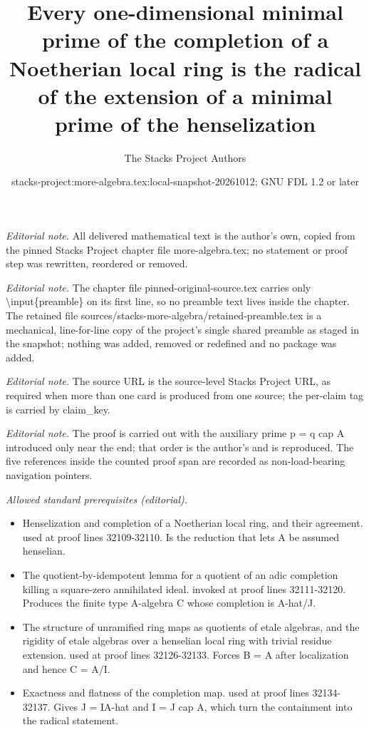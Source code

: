 \documentclass[10pt,a4paper]{amsart}
\title{Every one-dimensional minimal prime of the completion of a Noetherian local ring is the radical of the extension of a minimal prime of the henselization}
\author{The Stacks Project Authors}
\date{stacks-project:more-algebra.tex:local-snapshot-20261012; GNU FDL 1.2 or later}
\theoremstyle{plain}
\theoremstyle{definition}
\theoremstyle{remark}
\numberwithin{equation}{subsection}
\begin{document}
\maketitle
\setcounter{subsection}{1}
\noindent\textit{Editorial note.} All delivered mathematical text is the author's own, copied from the pinned Stacks Project chapter file more-algebra.tex; no statement or proof step was rewritten, reordered or removed.\par\medskip
\noindent\textit{Editorial note.} The chapter file pinned-original-source.tex carries only \textbackslash{}input\{preamble\} on its first line, so no preamble text lives inside the chapter. The retained file sources/stacks-more-algebra/retained-preamble.tex is a mechanical, line-for-line copy of the project's single shared preamble as staged in the snapshot; nothing was added, removed or redefined and no package was added.\par\medskip
\noindent\textit{Editorial note.} The source URL is the source-level Stacks Project URL, as required when more than one card is produced from one source; the per-claim tag is carried by claim\_key.\par\medskip
\noindent\textit{Editorial note.} The proof is carried out with the auxiliary prime p = q cap A introduced only near the end; that order is the author's and is reproduced. The five references inside the counted proof span are recorded as non-load-bearing navigation pointers.\par\medskip
\noindent\textit{Allowed standard prerequisites (editorial).}\begin{itemize}
\item Henselization and completion of a Noetherian local ring, and their agreement. used at proof lines 32109-32110. Is the reduction that lets A be assumed henselian.
\item The quotient-by-idempotent lemma for a quotient of an adic completion killing a square-zero annihilated ideal. invoked at proof lines 32111-32120. Produces the finite type A-algebra C whose completion is A-hat/J.
\item The structure of unramified ring maps as quotients of etale algebras, and the rigidity of etale algebras over a henselian local ring with trivial residue extension. used at proof lines 32126-32133. Forces B = A after localization and hence C = A/I.
\item Exactness and flatness of the completion map. used at proof lines 32134-32137. Gives J = IA-hat and I = J cap A, which turn the containment into the radical statement.
\end{itemize}\medskip
\end{document}
